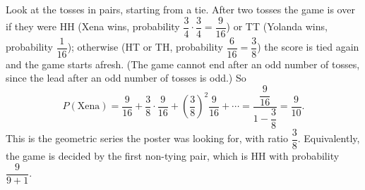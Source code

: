Look at the tosses in pairs, starting from a tie. After two tosses the game is over if they were HH (Xena wins, probability $\dfrac{3}{4}\cdot\dfrac{3}{4}=\dfrac{9}{16}$) or TT (Yolanda wins, probability $\dfrac{1}{16}$); otherwise (HT or TH, probability $\dfrac{6}{16}=\dfrac{3}{8}$) the score is tied again and the game starts afresh. (The game cannot end after an odd number of tosses, since the lead after an odd number of tosses is odd.) So
\[
P(\text{Xena})=\dfrac{9}{16}+\dfrac{3}{8}\cdot\dfrac{9}{16}+\left(\dfrac{3}{8}\right)^2\dfrac{9}{16}+\cdots=\dfrac{\dfrac{9}{16}}{1-\dfrac{3}{8}}=\boxed{\dfrac{9}{10}}.
\]
This is the geometric series the poster was looking for, with ratio $\dfrac{3}{8}$. Equivalently, the game is decided by the first non-tying pair, which is HH with probability $\dfrac{9}{9+1}$.
